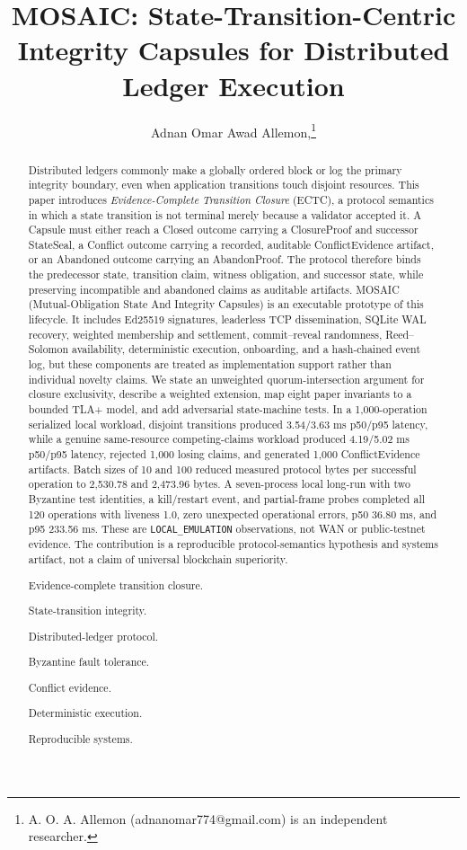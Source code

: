 \documentclass{ledger}
\title{MOSAIC: State-Transition-Centric Integrity Capsules for Distributed Ledger Execution}
\author{Adnan Omar Awad Allemon,\thanks{A. O. A. Allemon (adnanomar774@gmail.com) is an independent researcher.}}
\begin{document}
\maketitle
\thispagestyle{pagefirst}

\begin{abstract}
Distributed ledgers commonly make a globally ordered block or log the primary integrity boundary, even when application transitions touch disjoint resources. This paper introduces \emph{Evidence-Complete Transition Closure} (ECTC), a protocol semantics in which a state transition is not terminal merely because a validator accepted it. A Capsule must either reach a Closed outcome carrying a ClosureProof and successor StateSeal, a Conflict outcome carrying a recorded, auditable ConflictEvidence artifact, or an Abandoned outcome carrying an AbandonProof. The protocol therefore binds the predecessor state, transition claim, witness obligation, and successor state, while preserving incompatible and abandoned claims as auditable artifacts. MOSAIC (Mutual-Obligation State And Integrity Capsules) is an executable prototype of this lifecycle. It includes Ed25519 signatures, leaderless TCP dissemination, SQLite WAL recovery, weighted membership and settlement, commit--reveal randomness, Reed--Solomon availability, deterministic execution, onboarding, and a hash-chained event log, but these components are treated as implementation support rather than individual novelty claims. We state an unweighted quorum-intersection argument for closure exclusivity, describe a weighted extension, map eight paper invariants to a bounded TLA+ model, and add adversarial state-machine tests. In a 1,000-operation serialized local workload, disjoint transitions produced 3.54/3.63 ms p50/p95 latency, while a genuine same-resource competing-claims workload produced 4.19/5.02 ms p50/p95 latency, rejected 1,000 losing claims, and generated 1,000 ConflictEvidence artifacts. Batch sizes of 10 and 100 reduced measured protocol bytes per successful operation to 2,530.78 and 2,473.96 bytes. A seven-process local long-run with two Byzantine test identities, a kill/restart event, and partial-frame probes completed all 120 operations with liveness 1.0, zero unexpected operational errors, p50 36.80 ms, and p95 233.56 ms. These are \texttt{LOCAL\_EMULATION} observations, not WAN or public-testnet evidence. The contribution is a reproducible protocol-semantics hypothesis and systems artifact, not a claim of universal blockchain superiority.

\begin{keywords}
\item Evidence-complete transition closure.
\item State-transition integrity.
\item Distributed-ledger protocol.
\item Byzantine fault tolerance.
\item Conflict evidence.
\item Deterministic execution.
\item Reproducible systems.
\end{keywords}
\end{abstract}
\end{document}
